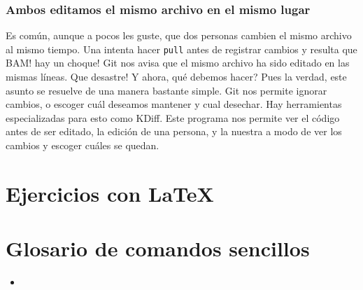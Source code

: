 \documentclass[10pt,letterpaper]{article}
\newcommand{\inlinecode}[1]{
\colorbox{light-gray}{\texttt{#1}}
}
\begin{document}
\subsubsection{Ambos editamos el mismo archivo en el mismo lugar}
Es com\'un, aunque a pocos les guste, que dos personas cambien el mismo archivo al mismo tiempo. Una intenta hacer \inlinecode{pull} antes de registrar cambios y resulta que BAM! hay un choque! Git nos avisa que el mismo archivo ha sido editado en las mismas l\'ineas. Que desastre! Y ahora, qu\'e debemos hacer? Pues la verdad, este asunto se resuelve de una manera bastante simple. Git nos permite ignorar cambios, o escoger cu\'al deseamos mantener y cual desechar. Hay herramientas especializadas para esto como KDiff. Este programa nos permite ver el c\'odigo antes de ser editado, la edici\'on de una persona, y la nuestra a modo de ver los cambios y escoger cu\'ales se quedan.

\section{Ejercicios con \LaTeX\ }

\section{Glosario de comandos sencillos}
\begin{small}

\begin{itemize}
\item 
\end{itemize}
\end{small}
\end{document}
